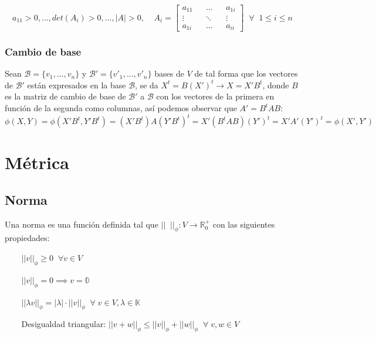 \documentclass{preset}
\begin{document}
\vspace{-15pt}
\[a_{11}>0, \dots ,det(A_{i})>0, \dots,|A|>0, \;\;\;\; A_{i}=
    \left[\begin{matrix}
    a_{11} && \dots && a_{1i} \\
    \vdots && \ddots && \vdots  \\
    a_{1i} && \dots && a_{ii}
    \end{matrix}\right]
    \;\; \forall \;\; 1\leq i\leq n
    \]

\vspace{-30pt}  
\subsubsection{Cambio de base}
Sean $\mathcal{B}=\{v_1,\dots,v_n\}$ y $\mathcal{B}'=\{v'_1,\dots,v'_n\}$ bases de $V$ de tal forma que los vectores de $\mathcal{B}'$ están expresados en la base $\mathcal{B}$, se da $X^t=B(X')^t\rightarrow X=X'B^t$, donde $B$ es la matriz de cambio de base de $\mathcal{B}'$ a $\mathcal{B}$ con los vectores de la primera en función de la segunda como columnas, así podemos observar que $A'=B^tAB$:
\vspace{-5pt}  
\[ \phi(X,Y)=\phi(X'B^t,Y'B^t)=(X'B^t)A(Y'B^t)^t=X'(B^tAB)(Y')^t=X'A'(Y')^t=\phi(X',Y')\]

\vspace{-30pt}
\section{Métrica}
\vspace{-15pt}
\subsection{Norma}
Una norma es una función definida tal que $||\;\;||_\phi:V \rightarrow \mathbb{R}^{+}_{0}$ con las siguientes propiedades:

\vspace{-10pt}
\begin{itemize}
	\item[$ $] $||v||_\phi \geq 0 \;\; \forall v \in V$
	\vspace{-10pt}
    \item[$ $] $||v||_\phi = 0 \implies v=\mathbb{0}$
    \vspace{-10pt}
    \item[$ $] $||\lambda v||_\phi = |\lambda| \cdot ||v||_\phi \;\; \forall \; v \in V, \lambda \in \mathbb{K} $
    \vspace{-10pt}
    \item[$ $] Desigualdad triangular: $||v+w||_\phi\leq ||v||_\phi + ||w||_\phi \;\; \forall \; v,w \in V$
\end{itemize}
\end{document}
